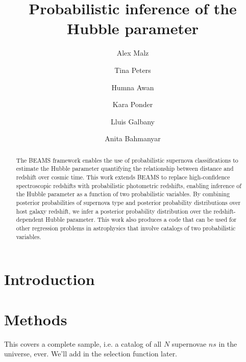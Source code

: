 \documentclass[12pt, onecolumn]{emulateapj}
\begin{document}
\title{Probabilistic inference of the Hubble parameter}

\author{Alex Malz}
\author{Tina Peters}
\author{Humna Awan}
\author{Kara Ponder}
\author{Lluis Galbany}
\author{Anita Bahmanyar}

\begin{abstract}
The BEAMS framework enables the use of probabilistic supernova classifications to estimate the Hubble parameter quantifying the relationship between distance and redshift over cosmic time.  This work extends BEAMS to replace high-confidence spectroscopic redshifts with probabilistic photometric redshifts, enabling inference of the Hubble parameter as a function of two probabilistic variables.  By combining posterior probabilities of supernova type and posterior probability distributions over host galaxy redshift, we infer a posterior probability distribution over the redshift-dependent Hubble parameter.  This work also produces a code that can be used for other regression problems in astrophysics that involve catalogs of two probabilistic variables.
\end{abstract}

\keywords{}

\section{Introduction}
\label{sec:intro}

\citet{kunz_bayesian_2007, kelly_flexible_2008}

\section{Methods}
\label{sec:meth}

This covers a complete sample, i.e. a catalog of all $N$ supernovae $ns$ in the universe, ever.  We'll add in the selection function later.
\end{document}
